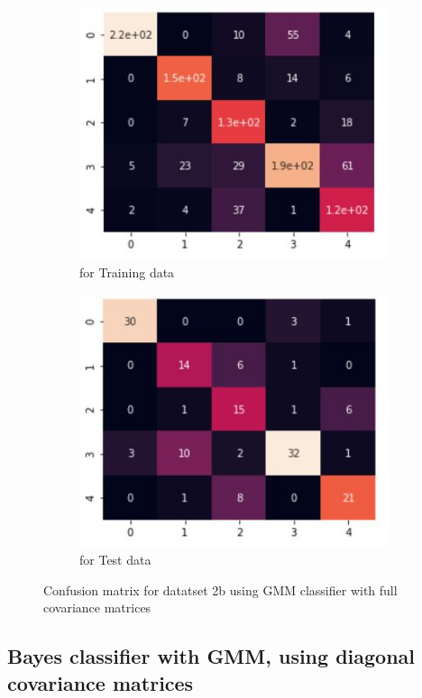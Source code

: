 \documentclass[11pt]{article}
\begin{document}
\begin{figure}[h]
\centering
	\begin{subfigure}[b]{0.45\textwidth}
	\centering
	\includegraphics[scale=0.6]{dataset2b_gmm_full_hm_train.jpg}
	\caption{for Training data}
	\label{fig:fig2.2.3.1}
	\end{subfigure}
	\hfill
	\begin{subfigure}[b]{0.45\textwidth}
	\centering
	\includegraphics[scale=0.6]{dataset2b_gmm_full_hm_test.jpg}
	\caption{for Test data}
	\label{fig:fig2.2.3.2}
	\end{subfigure}
\caption{Confusion matrix for datatset 2b using GMM classifier with full covariance matrices}
\label{fig:fig1.2.1}
\end{figure}

\newpage
\subsection{Bayes classifier with GMM, using diagonal covariance matrices}
\end{document}
